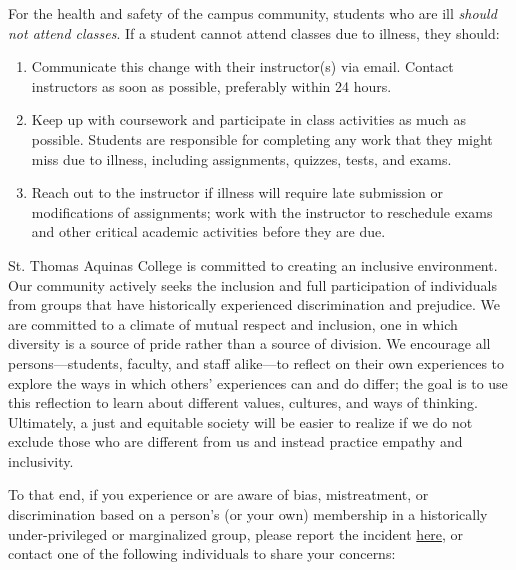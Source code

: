 \documentclass[11pt,letterpaper]{article}
\begin{document}

For the health and safety of the campus community, students who are ill {\itshape should not attend classes}. If a student cannot attend classes due to illness, they should:

	\begin{enumerate}[1.]
	\item Communicate this change with their instructor(s) via email. Contact instructors as soon as possible, preferably within 24 hours.
	\item Keep up with coursework and participate in class activities as much as possible. Students are responsible for completing any work that they might miss due to illness, including assignments, quizzes, tests, and exams.
	\item Reach out to the instructor if illness will require late submission or modifications of assignments; work with the instructor to reschedule exams and other critical academic activities before they are due.
	\end{enumerate} \sectionbreak




St. Thomas Aquinas College is committed to creating an inclusive environment. Our community actively seeks the inclusion and full participation of individuals from groups that have historically experienced discrimination and prejudice. We are committed to a climate of mutual respect and inclusion, one in which diversity is a source of pride rather than a source of division. We encourage all persons---students, faculty, and staff alike---to reflect on their own experiences to explore the ways in which others’ experiences can and do differ; the goal is to use this reflection to learn about different values, cultures, and ways of thinking. Ultimately, a just and equitable society will be easier to realize if we do not exclude those who are different from us and instead practice empathy and inclusivity. \pspace

To that end, if you experience or are aware of bias, mistreatment, or discrimination based on a person's (or your own) membership in a historically under-privileged or marginalized group, please report the incident \href{https://stac.edu/student-life/social-justice-equity/report-incident/}{here}, or contact one of the following individuals to share your concerns: \pspace
\end{document}
